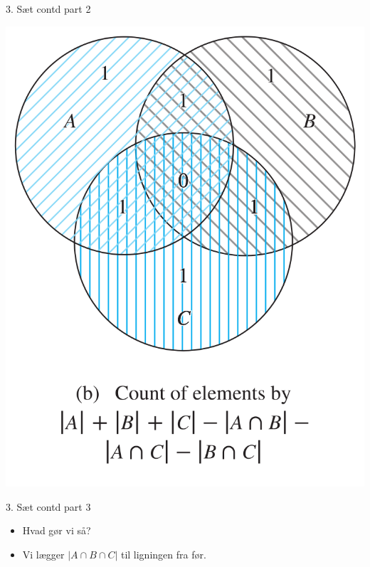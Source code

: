 \documentclass{beamer}
\begin{document}
\begin{frame}{3. Sæt contd part 2}
\begin{center}
    
   \includegraphics[scale=0.3]{81fig3b.png} 
\end{center}
\end{frame}

\begin{frame}{3. Sæt contd part 3}
   \begin{itemize}
       \item<1-> Hvad gør vi så? 
       \item<2-> Vi lægger $|A \cap B \cap C|$ til ligningen fra før.
   \end{itemize} 
\end{frame}
\end{document}
